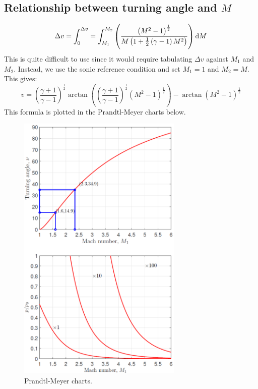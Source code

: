 \subsection{Relationship between turning angle and $M$}
\begin{equation}
    \Delta v = \int_0^{\Delta v} = \int_{M_1}^{M_2} \left(\frac{\left(M^2 - 1\right)^{\frac{1}{2}}}{M \left(1 + \frac{1}{2}\left(\gamma - 1\right)M^2\right)}\right)\dif M
\end{equation}
This is quite difficult to use since it would require tabulating $\Delta v$ against $M_1$ and $M_2$. Instead, we use the sonic reference condition and set $M_1 = 1$ and $M_2 = M$. This gives:
\begin{equation}
    v = \left(\frac{\gamma + 1}{\gamma -1}\right)^{\frac{1}{2}}\arctan\left(\left(\frac{\gamma + 1}{\gamma - 1}\right)^{\frac{1}{2}}\left(M^2 - 1\right)^{\frac{1}{2}}\right)-\arctan\left(M^2 - 1\right)^{\frac{1}{2}}
\end{equation}
This formula is plotted in the Prandtl-Meyer charts below.
\begin{figure}[H]
    \centering
    \includegraphics[width = 0.7\textwidth]{./img/diagram25.png}
    \caption{Prandtl-Meyer charts.}
\end{figure}
